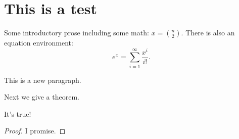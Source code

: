 \section{This is a test} %
\label{sec:this_is_a_test}

Some introductory prose including some math: $x = {n \choose 2}$.
There is also an equation environment:
\[
  e^x = \sum_{i=1}^\infty \frac{x^i}{i!}.
\]

This is a new paragraph.

Next we give a theorem.

  \begin{theorem}\label{thm:true_theorem}
    It's true!
  \end{theorem}
  \begin{proof}
    I promise.
  \end{proof}


